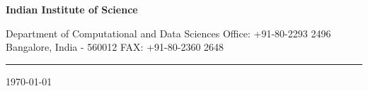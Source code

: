 \documentclass[float=false, crop=false]{standalone}
\begin{document}
\vspace*{-0.9in}
\begin{huge}
\centerline{\bf Indian Institute of Science}
\end{huge}
\vskip 0.08in
\begin{large}
\noindent
{\sf Department of Computational and Data Sciences}   \hfill
{\sf Office: +91-80-2293 2496 }\\
%
{\sf  Bangalore, India - 560012}   \hfill
{\sf  FAX: +91-80-2360 2648}  \\
\hrule
\end{large}
\begin{flushright}
\today \\
\end{flushright}
\end{document}

